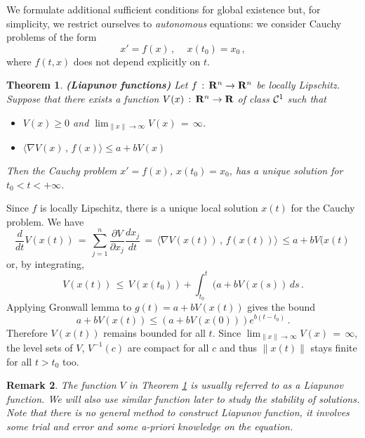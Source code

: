 \documentclass[12pt]{report}
\newcommand{\calC}{{\cal C}}
\newcommand{\bR}{{\bf R}}
\newtheorem{theorem}{Theorem}[section]
\newtheorem{remark}[theorem]{Remark}
\newcommand{\proof}{\noindent {\em Proof:~}}
\def\qed{\hbox{\hskip 6pt\vrule width6pt height7pt depth1pt
    \hskip1pt}\bigskip}
\def\to{\rightarrow}
\begin{document}
We formulate additional sufficient conditions for global existence but,
for simplicity, we restrict ourselves to {\em autonomous} equations: we
consider Cauchy problems of the form
\begin{equation}\label{cauchyaut}
x'=f(x)\,,\, \quad x(t_0) = x_0 \,,
\end{equation}
where $f(t,x)$ does not depend explicitly on $t$. 


\begin{theorem}{\bf (Liapunov functions)} \label{g2}
Let $f \,:\, \bR^n \to \bR^n$ be locally Lipschitz. Suppose that there
exists a function $V(x) \,:\, \bR^n \to \bR$ of class $\calC^1$ such
that
\begin{itemize}
\item $V(x) \ge 0$ and $\lim_{ \|x\| \to \infty} V(x) \,=\,  \infty$. 
\item $\langle \nabla V(x) \,,\, f(x) \rangle \le a + b V(x)$  
\end{itemize} 
Then the Cauchy problem $x'=f(x)$, $x(t_0) = x_0$, 
has a unique solution for   $t_0  < t <  +\infty$. 
\end{theorem} 


\proof Since $f$ is locally Lipschitz, there is a unique local
solution $x(t)$ for the Cauchy problem. We have
\begin{equation}
\frac{d}{dt} V(x(t)) \,=\, \sum_{j=1}^n \frac{\partial V}{\partial x_j} 
\frac{dx_j}{dt} \,=\, \langle \nabla V(x(t)) \,,\, f(x(t))\rangle
\, \le a + b V(x(t)\,
\end{equation}
or, by integrating, 
\begin{equation}
V(x(t)) \, \le \, V(x(t_0)) + \int_{t_0}^t (a + b V(x(s))\, ds \,.
\end{equation}
Applying Gronwall lemma to $g(t)= a+ b V(x(t))$ gives the bound 
\begin{equation}
a+ b V(x(t)) \le \left(a+ b V(x(0)) \right)e^{b(t-t_0)}\,.
\end{equation}  
Therefore $V(x(t))$ remains bounded
for all $t$. Since $\lim_{ \|x\| \to \infty} V(x) \,=\, \infty$, the level sets of 
$V$, $V^{-1}(c)$ are compact for all $c$  and thus $\|x(t)\|$ stays finite for all $t >t_0$ too.  
\hfill \qed

\begin{remark}{\rm  
The function $V$ in Theorem \ref{g2} is usually referred to as a {\em
Liapunov function}. We will also use similar function later to study
the stability of solutions.  Note that there is no general method to
construct Liapunov function, it involves some trial and error and some
a-priori knowledge on the equation. }
\end{remark}
\end{document}
